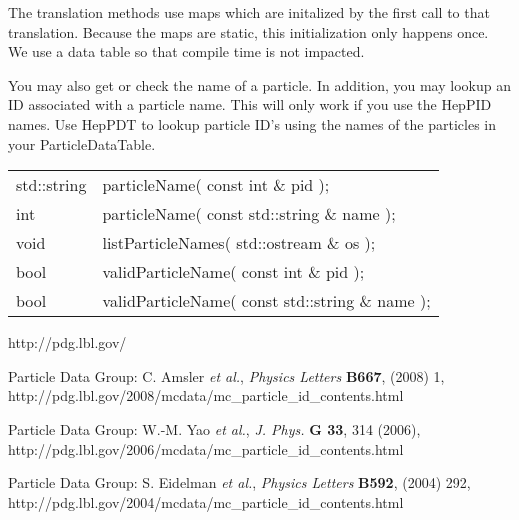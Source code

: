 The translation methods use maps which are initalized by the first call 
to that translation.
Because the maps are static, this initialization only happens once.
We use a data table so that compile time is not impacted.

You may also get or check the name of a particle.  
In addition, you may lookup an ID associated with a particle name.  
This will only work if you use the HepPID names. 
Use HepPDT to lookup particle ID's using the names of the 
particles in your ParticleDataTable.

\begin{center}
\begin{tabular}{ll}
std::string &  particleName( const int \& pid ); \\
int         &  particleName( const std::string \& name ); \\
void        &  listParticleNames( std::ostream \& os ); \\
bool        &  validParticleName( const int \& pid ); \\
bool        &  validParticleName( const std::string \& name ); \\
\end{tabular}
\end{center}

\def\etal{{\it et al.}}

\begin{thebibliography}{9}

http://pdg.lbl.gov/ 

Particle Data Group: C. Amsler \etal, \emph{Physics Letters} \textbf{B667}, (2008) 1, 
\newline
http://pdg.lbl.gov/2008/mcdata/mc\_particle\_id\_contents.html

Particle Data Group: W.-M. Yao \etal, \emph{J. Phys.} \textbf{G 33}, 314 (2006), 
\newline
http://pdg.lbl.gov/2006/mcdata/mc\_particle\_id\_contents.html

Particle Data Group: S. Eidelman  \etal, \emph{Physics Letters} \textbf{B592}, (2004) 292, 
\newline
http://pdg.lbl.gov/2004/mcdata/mc\_particle\_id\_contents.html

\end{thebibliography}

\newpage

